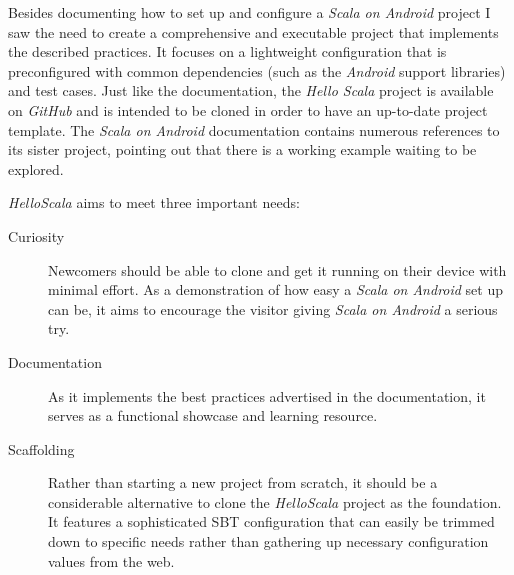 \begin{description}
	Besides documenting how to set up and configure a \textit{Scala on Android} project I saw the need to create a comprehensive and executable project that implements the described practices. It focuses on a lightweight configuration that is preconfigured with common dependencies (such as the \textit{Android} support libraries) and test cases. Just like the documentation, the \textit{Hello Scala} project is available on \textit{GitHub} and is intended to be cloned in order to have an up-to-date project template. The \textit{Scala on Android} documentation contains numerous references to its sister project, pointing out that there is a working example waiting to be explored.

	\textit{HelloScala} aims to meet three important needs:

	\begin{description}

		\item[Curiosity]\hfill

		Newcomers should be able to clone and get it running on their device with minimal effort. As a demonstration of how easy a \textit{Scala on Android} set up can be, it aims to encourage the visitor giving \textit{Scala on Android} a serious try.

		\item[Documentation]\hfill

		As it implements the best practices advertised in the documentation, it serves as a functional showcase and learning resource.

		\item[Scaffolding]\hfill

		Rather than starting a new project from scratch, it should be a considerable alternative to clone the \textit{HelloScala} project as the foundation. It features a sophisticated \ac{SBT} configuration that can easily be trimmed down to specific needs rather than gathering up necessary configuration values from the web.

	\end{description}

\end{description}